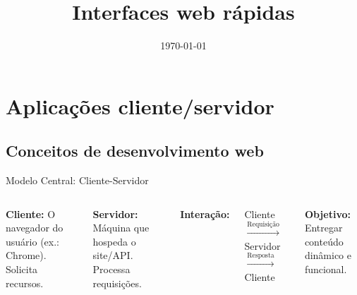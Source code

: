 \documentclass{beamer}
\title{Interfaces web rápidas}
\date{\today}
\begin{document}
    


\sumario

\section{Aplicações cliente/servidor}

\subsection{Conceitos de desenvolvimento web}
\begin{frame}{Modelo Central: Cliente-Servidor}
\begin{columns}[t]
\textbf{Cliente:} O navegador do usuário (ex.: Chrome). Solicita recursos.
\vspace{0.3cm}

\textbf{Servidor:} Máquina que hospeda o site/API. Processa requisições.
\vspace{0.3cm}

\textbf{Interação:} 

Cliente $\xrightarrow{\text{Requisição}}$ Servidor $\xrightarrow{\text{Resposta}}$ Cliente

\vspace{0.5cm}
\textbf{Objetivo:} Entregar conteúdo dinâmico e funcional.
\end{columns}

\begin{figure}
\centering
{}
\end{figure}

\end{frame}
\end{document}
